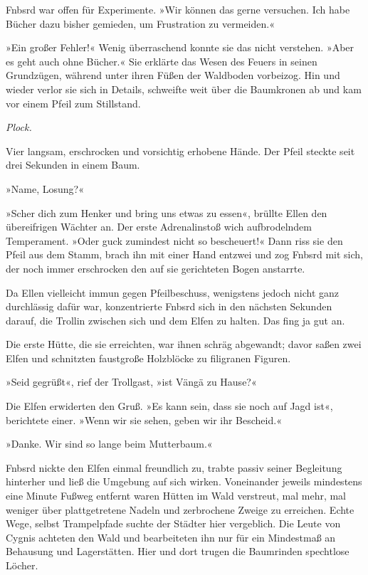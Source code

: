 Fnbsrd war offen für Experimente. »Wir können das gerne versuchen. Ich habe Bücher dazu bisher gemieden, um Frustration zu vermeiden.«

»Ein großer Fehler!« Wenig überraschend konnte sie das nicht verstehen. »Aber es geht auch ohne Bücher.« Sie erklärte das Wesen des Feuers in seinen Grundzügen, während unter ihren Füßen der Waldboden vorbeizog. Hin und wieder verlor sie sich in Details, schweifte weit über die Baumkronen ab und kam vor einem Pfeil zum Stillstand.

\textit{Plock.}

Vier langsam, erschrocken und vorsichtig erhobene Hände. Der Pfeil steckte seit drei Sekunden in einem Baum.

»Name, Losung?«

»Scher dich zum Henker und bring uns etwas zu essen«, brüllte Ellen den übereifrigen Wächter an. Der erste Adrenalinstoß wich aufbrodelndem Temperament. »Oder guck zumindest nicht so bescheuert!« Dann riss sie den Pfeil aus dem Stamm, brach ihn mit einer Hand entzwei und zog Fnbsrd mit sich, der noch immer erschrocken den auf sie gerichteten Bogen anstarrte.

Da Ellen vielleicht immun gegen Pfeilbeschuss, wenigstens jedoch nicht ganz durchlässig dafür war, konzentrierte Fnbsrd sich in den nächsten Sekunden darauf, die Trollin zwischen sich und dem Elfen zu halten. Das fing ja gut an.

Die erste Hütte, die sie erreichten, war ihnen schräg abgewandt; davor saßen zwei Elfen und schnitzten faustgroße Holzblöcke zu filigranen Figuren.

»Seid gegrüßt«, rief der Trollgast, »ist Vängä zu Hause?«

Die Elfen erwiderten den Gruß. »Es kann sein, dass sie noch auf Jagd ist«, berichtete einer. »Wenn wir sie sehen, geben wir ihr Bescheid.«

»Danke. Wir sind so lange beim Mutterbaum.«

Fnbsrd nickte den Elfen einmal freundlich zu, trabte passiv seiner Begleitung hinterher und ließ die Umgebung auf sich wirken. Voneinander jeweils mindestens eine Minute Fußweg entfernt waren Hütten im Wald verstreut, mal mehr, mal weniger über plattgetretene Nadeln und zerbrochene Zweige zu erreichen. Echte Wege, selbst Trampelpfade suchte der Städter hier vergeblich. Die Leute von Cygnis achteten den Wald und bearbeiteten ihn nur für ein Mindestmaß an Behausung und Lagerstätten. Hier und dort trugen die Baumrinden spechtlose Löcher.

